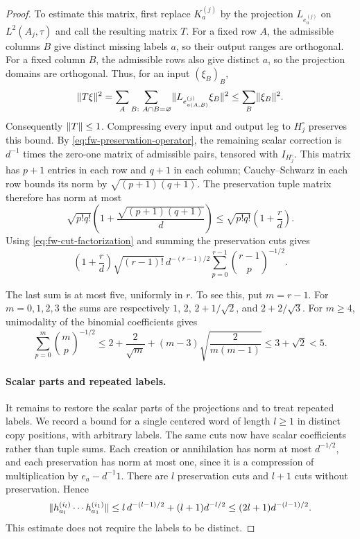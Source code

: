 \begin{proof}
To estimate this matrix, first replace $K_a^{(j)}$ by the projection
$L_{e_a^{(j)}}$ on $L^2(A_j,\tau)$ and call the resulting matrix $T$.
For a fixed row $A$, the admissible columns $B$ give distinct missing
labels $a$, so their output ranges are orthogonal.  For a fixed
column $B$, the admissible rows also give distinct $a$, so the
projection domains are orthogonal.  Thus, for an input $(\xi_B)_B$,
\[
 \lVert T\xi\rVert^2
 =\sum_A\sum_{\substack{B:\ A\cap B=\varnothing}}
      \lVert L_{e_{a(A,B)}^{(j)}}\xi_B\rVert^2
 \leq\sum_B\lVert\xi_B\rVert^2.
\]
Consequently $\lVert T\rVert\leq1$.  Compressing every input and output
leg to $H_j^\circ$ preserves this bound.  By
\eqref{eq:fw-preservation-operator}, the remaining scalar correction
is $d^{-1}$ times the zero-one matrix of admissible pairs, tensored
with $I_{H_j^\circ}$.  This matrix has $p+1$ entries in each row
and $q+1$ in each column; Cauchy--Schwarz in each row bounds its
norm by $\sqrt{(p+1)(q+1)}$.  The preservation tuple matrix therefore
has norm at most
\[
 \sqrt{p!q!}
       \left(1+\frac{\sqrt{(p+1)(q+1)}}d\right)
 \leq\sqrt{p!q!}\left(1+\frac rd\right).
\]
Using \eqref{eq:fw-cut-factorization} and summing the preservation
cuts gives
\begin{equation}\label{eq:fw-preservation-sum}
 \left(1+\frac rd\right)\sqrt{(r-1)!}\,d^{-(r-1)/2}
       \sum_{p=0}^{r-1}\binom{r-1}{p}^{-1/2}.
\end{equation}

The last sum is at most five, uniformly in $r$.  To see this, put
$m=r-1$.  For $m=0,1,2,3$ the sums are respectively
$1$, $2$, $2+1/\sqrt2$, and $2+2/\sqrt3$.  For $m\geq4$,
unimodality of the binomial coefficients gives
\[
 \sum_{p=0}^m\binom mp^{-1/2}
 \leq2+\frac2{\sqrt m}
         +(m-3)\sqrt{\frac2{m(m-1)}}
 \leq3+\sqrt2<5.
\]

\paragraph{Scalar parts and repeated labels.}
It remains to restore the scalar parts of the projections and to
treat repeated labels.  We record a bound for a single centered
word of length $l\geq1$ in distinct copy positions, with arbitrary
labels.  The same cuts now have scalar coefficients rather than
tuple sums.  Each creation or annihilation has norm at most
$d^{-1/2}$, and each preservation has norm at most one, since it is
a compression of multiplication by $e_a-d^{-1}1$.  There are $l$
preservation cuts and $l+1$ cuts without preservation.  Hence
\begin{equation}\label{eq:fw-single-word}
 \lVert h_{a_l}^{(i_l)}\cdots h_{a_1}^{(i_1)}\rVert
 \leq l\,d^{-(l-1)/2}+(l+1)d^{-l/2}
 \leq(2l+1)d^{-(l-1)/2}.
\end{equation}
This estimate does not require the labels to be distinct.


\end{proof}
